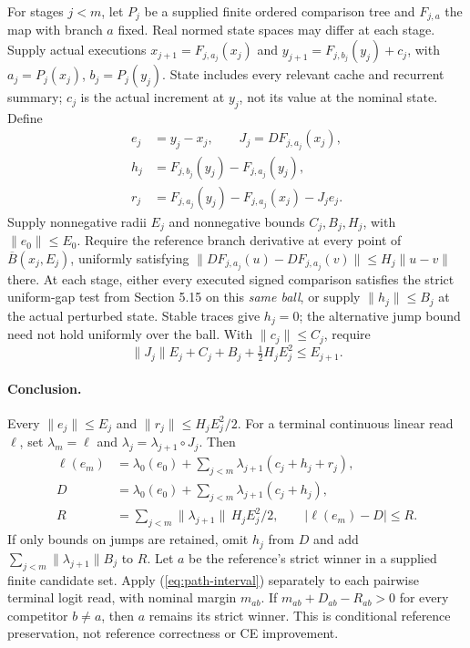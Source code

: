 \documentclass[11pt]{article}
\numberwithin{equation}{section}
\begin{document}
For stages $j<m$, let $P_j$ be a supplied finite ordered comparison tree and $F_{j,a}$ the map with
branch $a$ fixed. Real normed state spaces may differ at each stage. Supply actual executions
$x_{j+1}=F_{j,a_j}(x_j)$ and $y_{j+1}=F_{j,b_j}(y_j)+c_j$, with
$a_j=P_j(x_j)$, $b_j=P_j(y_j)$. State includes every relevant cache and recurrent summary;
$c_j$ is the actual increment at $y_j$, not its value at the nominal state. Define
\begin{equation}\label{eq:path-terms}
\begin{split}
e_j&=y_j-x_j,\qquad J_j=DF_{j,a_j}(x_j),\\
h_j&=F_{j,b_j}(y_j)-F_{j,a_j}(y_j),\\
r_j&=F_{j,a_j}(y_j)-F_{j,a_j}(x_j)-J_je_j.
\end{split}
\end{equation}
Supply nonnegative radii $E_j$ and nonnegative bounds $C_j,B_j,H_j$, with $\|e_0\|\le E_0$. Require the reference
branch derivative at every point of $\overline B(x_j,E_j)$, uniformly satisfying
$\|DF_{j,a_j}(u)-DF_{j,a_j}(v)\|\le H_j\|u-v\|$ there. At each stage, either every executed signed
comparison satisfies the strict uniform-gap test from Section 5.15 on this \emph{same ball}, or supply
$\|h_j\|\le B_j$ at the actual perturbed state. Stable traces give $h_j=0$; the alternative jump bound
need not hold uniformly over the ball. With $\|c_j\|\le C_j$, require
\begin{equation}\label{eq:path-radius}
\|J_j\|E_j+C_j+B_j+\tfrac12H_jE_j^2\le E_{j+1}.
\end{equation}

\paragraph{Conclusion.}
Every $\|e_j\|\le E_j$ and $\|r_j\|\le H_jE_j^2/2$. For a terminal continuous linear read $\ell$,
set $\lambda_m=\ell$ and $\lambda_j=\lambda_{j+1}\circ J_j$. Then
\begin{equation}\label{eq:path-interval}
\begin{split}
\ell(e_m)&=\lambda_0(e_0)+\sum_{j<m}\lambda_{j+1}(c_j+h_j+r_j),\\
D&=\lambda_0(e_0)+\sum_{j<m}\lambda_{j+1}(c_j+h_j),\\
R&=\sum_{j<m}\|\lambda_{j+1}\|\,H_jE_j^2/2,\qquad |\ell(e_m)-D|\le R.
\end{split}
\end{equation}
If only bounds on jumps are retained, omit $h_j$ from $D$ and add
$\sum_{j<m}\|\lambda_{j+1}\|B_j$ to $R$. Let $a$ be the reference's strict winner in a supplied
finite candidate set. Apply (\ref{eq:path-interval}) separately to each pairwise terminal logit read, with
nominal margin $m_{ab}$. If $m_{ab}+D_{ab}-R_{ab}>0$ for every competitor $b\ne a$, then $a$ remains
its strict winner. This is conditional reference preservation, not reference correctness or CE improvement.
\end{document}
